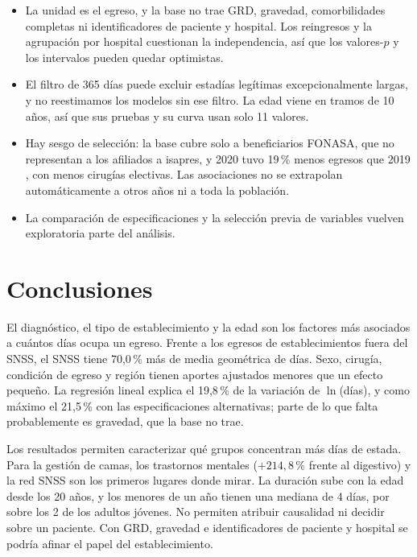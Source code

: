 \documentclass[10.5pt,a4paper,headings=small,abstract=false,bibliography=totoc,listof=totoc]{scrartcl}
\newcommand{\pct}{\,\%}
\begin{document}
\begin{itemize}\setlength\itemsep{0pt}
\item La unidad es el egreso, y la base no trae GRD, gravedad, comorbilidades completas ni identificadores de paciente y hospital. Los reingresos y la agrupación por hospital cuestionan la independencia, así que los valores-$p$ y los intervalos pueden quedar optimistas.
\item El filtro de 365 días puede excluir estadías legítimas excepcionalmente largas, y no reestimamos los modelos sin ese filtro. La edad viene en tramos de 10 años, así que sus pruebas y su curva usan solo 11 valores.
\item Hay sesgo de selección: la base cubre solo a beneficiarios FONASA, que no representan a los afiliados a isapres, y 2020 tuvo 19\pct{} menos egresos que 2019 \citep{barahona2021}, con menos cirugías electivas. Las asociaciones no se extrapolan automáticamente a otros años ni a toda la población.
\item La comparación de especificaciones y la selección previa de variables vuelven exploratoria parte del análisis.
\end{itemize}

\section{Conclusiones}

El diagnóstico, el tipo de establecimiento y la edad son los factores más asociados a cuántos días ocupa un egreso. Frente a los egresos de establecimientos fuera del SNSS, el SNSS tiene 70,0\pct{} más de media geométrica de días. Sexo, cirugía, condición de egreso y región tienen aportes ajustados menores que un efecto pequeño. La regresión lineal explica el 19,8\pct{} de la variación de $\ln$(días), y como máximo el 21,5\pct{} con las especificaciones alternativas; parte de lo que falta probablemente es gravedad, que la base no trae.

Los resultados permiten caracterizar qué grupos concentran más días de estada. Para la gestión de camas, los trastornos mentales ($+214{,}8\pct{}$ frente al digestivo) y la red SNSS son los primeros lugares donde mirar. La duración sube con la edad desde los 20 años, y los menores de un año tienen una mediana de 4 días, por sobre los 2 de los adultos jóvenes. No permiten atribuir causalidad ni decidir sobre un paciente. Con GRD, gravedad e identificadores de paciente y hospital se podría afinar el papel del establecimiento.\label{fincuerpo}
\end{document}
